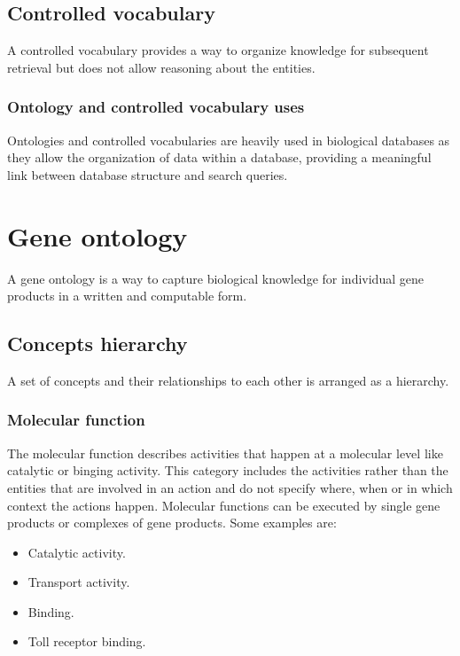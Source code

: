 	\subsection{Controlled vocabulary}
	A controlled vocabulary provides a way to organize knowledge for subsequent retrieval but does not allow reasoning about the entities.

	\subsubsection{Ontology and controlled vocabulary uses}
	Ontologies and controlled vocabularies are heavily used in biological databases as they allow the organization of data within a database, providing a meaningful link between database structure and search queries.


\section{Gene ontology}
A gene ontology is a way to capture biological knowledge for individual gene products in a written and computable form.

	\subsection{Concepts hierarchy}
	A set of concepts and their relationships to each other is arranged as a hierarchy.

		\subsubsection{Molecular function}
		The molecular function describes activities that happen at a molecular level like catalytic or binging activity.
		This category includes the activities rather than the entities that are involved in an action and do not specify where, when or in which context the actions happen.
		Molecular functions can be executed by single gene products or complexes of gene products.
		Some examples are:

		\begin{multicols}{4}
			\begin{itemize}
				\item Catalytic activity.
				\item Transport activity.
				\item Binding.
				\item Toll receptor binding.
			\end{itemize}
		\end{multicols}


